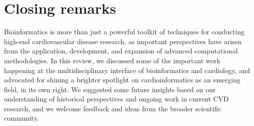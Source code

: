 \documentclass[letter]{bioinfo}
\begin{document}
		
		
	
	
	
	

	

	
	

	
	
	
	

	


	
	
	
	
	\section*{Closing remarks}
Bioinformatics is more than just a powerful toolkit of techniques for conducting high-end cardiovascular disease research, as important perspectives have arisen from the application, development, and expansion of advanced computational methodologies.  In this review, we discussed some of the important work happening at the multidisciplinary interface of bioinformatics and cardiology, and advocated for shining a brighter spotlight on cardioinformatics as an emerging field, in its own right.  We suggested some future insights based on our understanding of historical perspectives and ongoing work in current CVD research, and we welcome feedback and ideas from the broader scientific community.
\end{document}
